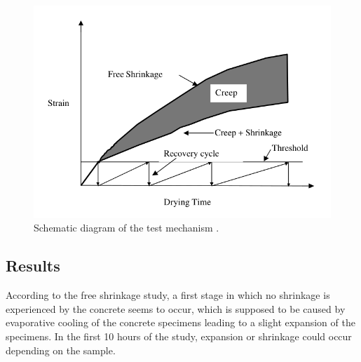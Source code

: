\documentclass{report}
\begin{document}
\begin{figure}
  \centering
  \includegraphics[width=.5\linewidth]{fig/aci1}
  \caption{Schematic diagram of the test mechanism \cite{cscea}.}\label{aci1}
\end{figure}

\subsection{Results}
According to the free shrinkage study, a first stage in which no shrinkage is
experienced by the concrete seems to occur, which is supposed to be caused by
evaporative cooling of the concrete specimens leading to a slight expansion of
the specimens. In the first 10 hours of the study, expansion or shrinkage could
occur depending on the sample.
\end{document}
